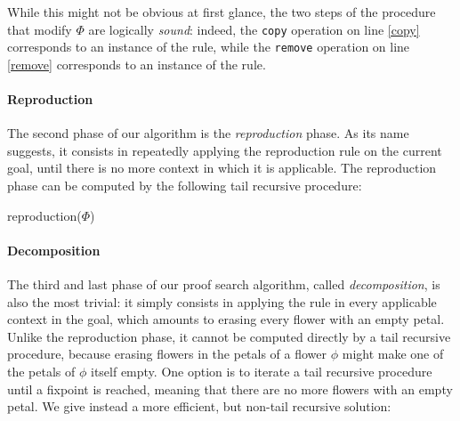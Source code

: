 While this might not be obvious at first glance, the two steps of the
 procedure that modify $\Phi$ are logically
\emph{sound}: indeed, the \texttt{copy} operation on line \ref{copy} corresponds
to an instance of the  rule, while the \texttt{remove} operation
on line \ref{remove} corresponds to an instance of the  rule.

\paragraph{Reproduction}

The second phase of our algorithm is the \emph{reproduction} phase. As its name
suggests, it consists in repeatedly applying the reproduction rule  on
the current goal, until there is no more context in which it is
applicable. The reproduction phase can be computed by the following tail
recursive procedure:

\begin{procedure}[H]
  \caption{reproduction($\Phi$)}
  \BlankLine

\end{procedure}

\paragraph{Decomposition}

The third and last phase of our proof search algorithm, called
\emph{decomposition}, is also the most trivial: it simply consists in applying
the  rule in every applicable context in the goal, which amounts to
erasing every flower with an empty petal. Unlike the reproduction phase, it cannot be
computed directly by a tail recursive procedure, because erasing flowers in the
petals of a flower $\phi$ might make one of the petals of $\phi$ itself empty.
One option is to iterate a tail recursive procedure until a fixpoint is reached,
meaning that there are no more flowers with an empty petal. We give instead a
more efficient, but non-tail recursive solution:

